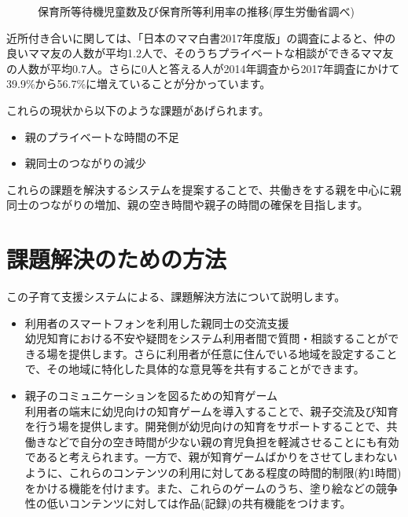 \documentclass[a4j]{jarticle}
\begin{document}
\begin{figure}[H]
\begin{center}
\caption{保育所等待機児童数及び保育所等利用率の推移(厚生労働省調べ)}
\label{fig:2}
\end{center}
\end{figure}

近所付き合いに関しては、「日本のママ白書2017年度版」の調査によると、仲の良いママ友の人数が平均1.2人で、そのうちプライベートな相談ができるママ友の人数が平均0.7人。さらに0人と答える人が2014年調査から2017年調査にかけて39.9\%から56.7\%に増えていることが分かっています\cite{bib:mama}。

これらの現状から以下のような課題があげられます。

\begin{itemize}
\item 親のプライベートな時間の不足
\item 親同士のつながりの減少
\end{itemize}

これらの課題を解決するシステムを提案することで、共働きをする親を中心に親同士のつながりの増加、親の空き時間や親子の時間の確保を目指します。


\section{課題解決のための方法}
この子育て支援システムによる、課題解決方法について説明します。
\begin{itemize}
  \item 利用者のスマートフォンを利用した親同士の交流支援 ~\\
    幼児知育における不安や疑問をシステム利用者間で質問・相談することができる場を提供します。さらに利用者が任意に住んでいる地域を設定することで、その地域に特化した具体的な意見等を共有することができます。
  \item 親子のコミュニケーションを図るための知育ゲーム ~\\
    利用者の端末に幼児向けの知育ゲームを導入することで、親子交流及び知育を行う場を提供します。開発側が幼児向けの知育をサポートすることで、共働きなどで自分の空き時間が少ない親の育児負担を軽減させることにも有効であると考えられます。一方で、親が知育ゲームばかりをさせてしまわないように、これらのコンテンツの利用に対してある程度の時間的制限(約1時間)をかける機能を付けます。また、これらのゲームのうち、塗り絵などの競争性の低いコンテンツに対しては作品(記録)の共有機能をつけます。
\end{itemize}
\end{document}

